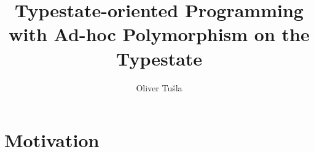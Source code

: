 \documentclass[sigconf,screen,nonacm]{acmart}
\begin{document}
\title{Typestate-oriented Programming with Ad-hoc Polymorphism on the Typestate}

\author{Oliver Tušla}





\maketitle

\section{Motivation}
\end{document}
